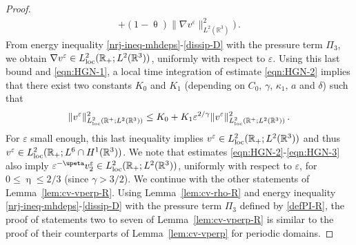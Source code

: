 \documentclass[11pt,reqno]{amsart}
\def \R{{\mathbb{R}}}
\begin{document}
\begin{proof}
\begin{align}
  +(1-\uptheta)\|\nabla v^\varepsilon\|_{L^{2}(\R^3)}^{2}\big)\,.
  \label{eqn:HGN-2}
\end{align}
From energy inequality \eqref{nrj-ineq-mhdeps}-\eqref{dissip-D} with the pressure term $\Pi_3$, we obtain $\nabla v^\varepsilon \in L_{\rm loc}^2(\R_+;L^2(\R^3))$,
uniformly with respect to $\varepsilon$. Using this last bound and \eqref{eqn:HGN-1}, a local time integration of estimate \eqref{eqn:HGN-2} implies that there exist two constants $K_0$ and $K_1$ (depending on $C_0$, $\gamma$, $\kappa_1$, $a$ and $\delta$) such that
\begin{equation}
\|v^\varepsilon\|_{L_{\rm loc}^2(\R^+;L^2(\R^3))}^2 \leq K_0 + K_1\varepsilon^{2/\gamma}  \|v^\varepsilon\|_{L_{\rm loc}^2(\R^+;L^2(\R^3))}^2\,. 
\label{eqn:HGN-3}
\end{equation}
For $\varepsilon$ small enough, this last inequality implies $v^\varepsilon \in L_{\rm loc}^2(\R_+;L^2(\R^3))$ and thus $v^\varepsilon \in L_{\rm loc}^2(\R_+;L^6\cap H^1(\R^3))$. We note that estimates \eqref{eqn:HGN-2}-\eqref{eqn:HGN-3} also imply $\varepsilon^{-\upeta} v_2^\varepsilon \in L_{\rm loc}^2(\R_+;L^2(\R^3))$, uniformly with respect to $\varepsilon$, for  $0\leq \upeta \leq 2/3$ (since $\gamma >3/2$). We continue with the other statements of Lemma~\ref{lem:cv-vperp-R}. Using Lemma~\ref{lem:cv-rho-R} and energy inequality \eqref{nrj-ineq-mhdeps}-\eqref{dissip-D} with the pressure term $\Pi_3$ defined by \eqref{defPI-R}, the proof of statements two to seven of Lemma~\ref{lem:cv-vperp-R} is similar to the proof of their counterparts of Lemma~\ref{lem:cv-vperp} for periodic domains.
\end{proof}
\end{document}
